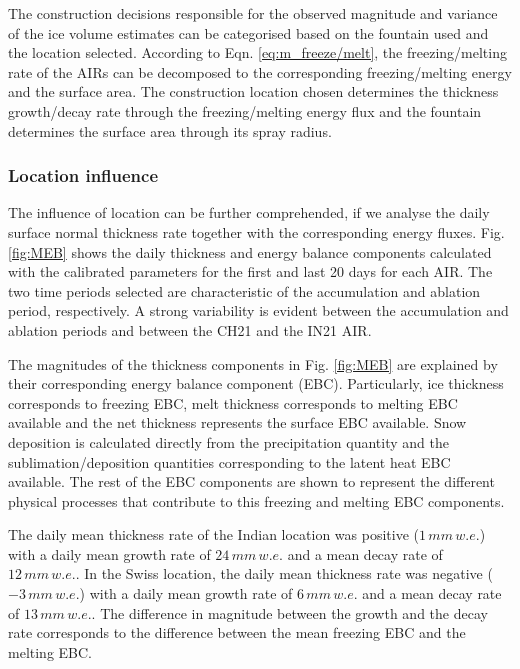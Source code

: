 \documentclass[utf8]{frontiersSCNS} %
\begin{document}
The construction decisions responsible for the observed magnitude and variance of the ice volume estimates can
be categorised based on the fountain used and the location selected. According to Eqn.  \ref{eq:m_freeze/melt},
the freezing/melting rate of the AIRs can be decomposed to the corresponding freezing/melting energy and the
surface area. The construction location chosen determines the thickness growth/decay rate through the
freezing/melting energy flux and the fountain determines the surface area through its spray radius.

\subsubsection{Location influence}

The influence of location can be further comprehended, if we analyse the daily surface normal thickness rate
together with the corresponding energy fluxes. Fig.  \ref{fig:MEB} shows the daily thickness and energy balance
components calculated with the calibrated parameters for the first and last 20 days for each AIR. The two time
periods selected are characteristic of the accumulation and ablation period, respectively. A strong variability is
evident between the accumulation and ablation periods and between the CH21 and the IN21 AIR.

The magnitudes of the thickness components in Fig. \ref{fig:MEB} are explained by their corresponding
energy balance component (EBC).  Particularly, ice thickness corresponds to freezing EBC, melt thickness
corresponds to melting EBC available and the net thickness represents the surface EBC available.  Snow
deposition is calculated directly from the precipitation quantity and the sublimation/deposition quantities
corresponding to the latent heat EBC available.  The rest of the EBC components are shown to represent the
different physical processes that contribute to this freezing and melting EBC components.

The daily mean thickness rate of the Indian location was positive ($1\, mm \,w.e.$) with a daily mean growth
rate of $24\, mm \,w.e.$ and a mean decay rate of $12\, mm \,w.e.$. In the Swiss location, the daily mean
thickness rate was negative ($-3\, mm \,w.e.$) with a daily mean growth rate of $6\, mm \,w.e.$ and a mean decay
rate of $13\, mm \,w.e.$. The difference in magnitude between the growth and the decay rate corresponds to the
difference between the mean freezing EBC and the melting EBC.
\end{document}
